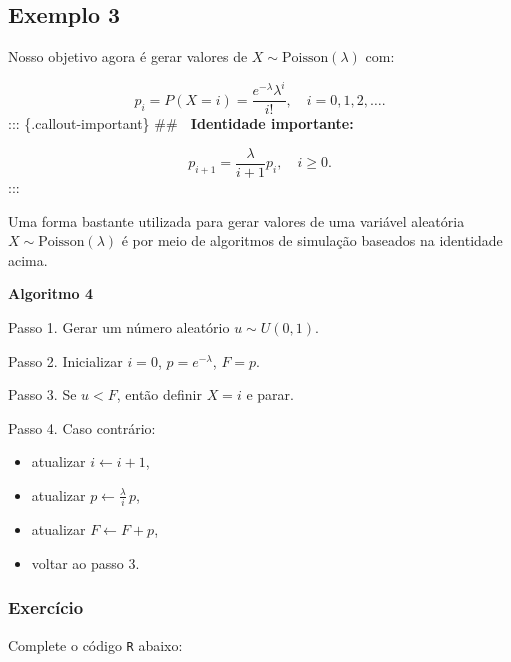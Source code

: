 \documentclass[
  letterpaper,
  DIV=11,
  numbers=noendperiod]{scrreprt}
\begin{document}
\subsection*{Exemplo 3}\label{exemplo-3}

Nosso objetivo agora é gerar valores de
\(X\sim \mbox{Poisson}(\lambda)\) com:

\[p_i=P(X=i)=\dfrac{e^{-\lambda}\lambda^i}{i!}, \quad i=0,1,2,\ldots. \]
::: \{.callout-important\} \#\# 🔎 \textbf{Identidade importante:}

\[p_{i+1} = \dfrac{\lambda}{i+1}p_i, \quad i\geq 0.\] :::

Uma forma bastante utilizada para gerar valores de uma variável
aleatória \(X\sim \mbox{Poisson}(\lambda)\) é por meio de algoritmos de
simulação baseados na identidade acima.

\begin{tcolorbox}[enhanced jigsaw, toprule=.15mm, arc=.35mm, colframe=quarto-callout-warning-color-frame, breakable, opacityback=0, rightrule=.15mm, bottomrule=.15mm, left=2mm, leftrule=.75mm, colback=white]

\vspace{-3mm}\textbf{Algoritmo 4}\vspace{3mm}

Passo 1. Gerar um número aleatório \(u \sim U(0,1)\).

Passo 2. Inicializar \(i = 0\), \(p = e^{-\lambda}\), \(F = p\).

Passo 3. Se \(u < F\), então definir \(X = i\) e parar.

Passo 4. Caso contrário:

\begin{itemize}
\item
  atualizar \(i \leftarrow i+1\),
\item
  atualizar \(p \leftarrow \frac{\lambda}{i}\,p\),
\item
  atualizar \(F \leftarrow F + p\),
\item
  voltar ao passo 3.
\end{itemize}

\end{tcolorbox}

\subsubsection*{Exercício}\label{exercuxedcio}

Complete o código \texttt{R} abaixo:
\end{document}
